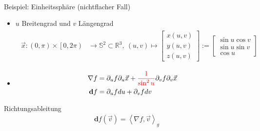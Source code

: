 \documentclass{beamer}
\newcommand{\R}{\mathds{R}}
\newcommand{\exd}{\mathbf{d}}
\newcommand{\tred}[1]{\textcolor{red}{#1}}
\begin{document}
  \begin{frame}
    \begin{block}{Beispiel: Einheitssphäre (nichtflacher Fall)}
      \begin{itemize}
        \item \( u \) Breitengrad und \( v \) Längengrad
        \begin{align*}
        \begin{aligned}
        \vec{x}: \left( 0, \pi \right) \times \left[ 0 , 2\pi \right)
                    &\rightarrow \mathds{S}^{2} \subset \R^{3},\ 
             \left( u,v \right) 
                    \mapsto\begin{bmatrix}
                              x(u,v) \\ y(u,v) \\ z(u,v)
                            \end{bmatrix}
                    := \begin{bmatrix}
                        \sin u \cos v \\
                        \sin u \sin v \\
                        \cos u
                      \end{bmatrix}
      \end{aligned}
      \end{align*}
      \item 
        \begin{align*}
          \nabla f &= \partial_{u} f \partial_{u}\vec{x} + \tred{\frac{1}{\sin^{2}u}} \partial_{v} f \partial_{v}\vec{x} \\
          \exd f  &=  \partial_{u} f du + \partial_{v} f dv
        \end{align*}
      \end{itemize}
    \end{block}

    \begin{block}{Richtungsableitung}
      \begin{align*}
        \exd f(\vec{v}) = \left\langle \nabla f , \vec{v} \right\rangle_{g}
      \end{align*}
    \end{block}
  \end{frame}
\end{document}
